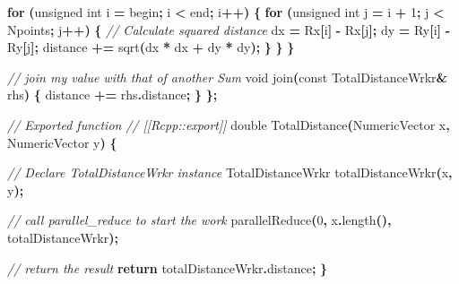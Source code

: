 \documentclass[
  12pt,
  french,
  a4paper,
  extrafontsizes,onecolumn,openright
  ]{memoir}
\newenvironment{Shaded}{\begin{snugshade}}{\end{snugshade}}
\newcommand{\AttributeTok}[1]{\textcolor[rgb]{0.13,0.29,0.53}{#1}}
\newcommand{\CommentTok}[1]{\textcolor[rgb]{0.56,0.35,0.01}{\textit{#1}}}
\newcommand{\ControlFlowTok}[1]{\textcolor[rgb]{0.13,0.29,0.53}{\textbf{#1}}}
\newcommand{\DataTypeTok}[1]{\textcolor[rgb]{0.13,0.29,0.53}{#1}}
\newcommand{\DecValTok}[1]{\textcolor[rgb]{0.00,0.00,0.81}{#1}}
\newcommand{\NormalTok}[1]{#1}
\newcommand{\OperatorTok}[1]{\textcolor[rgb]{0.81,0.36,0.00}{\textbf{#1}}}
\begin{document}
\begin{Shaded}
\begin{Highlighting}[]
    \ControlFlowTok{for} \OperatorTok{(}\DataTypeTok{unsigned} \DataTypeTok{int}\NormalTok{ i }\OperatorTok{=}\NormalTok{ begin}\OperatorTok{;}\NormalTok{ i }\OperatorTok{\textless{}}\NormalTok{ end}\OperatorTok{;}\NormalTok{ i}\OperatorTok{++)} \OperatorTok{\{}
      \ControlFlowTok{for} \OperatorTok{(}\DataTypeTok{unsigned} \DataTypeTok{int}\NormalTok{ j }\OperatorTok{=}\NormalTok{ i }\OperatorTok{+} \DecValTok{1}\OperatorTok{;}\NormalTok{ j }\OperatorTok{\textless{}}\NormalTok{ Npoints}\OperatorTok{;}\NormalTok{ j}\OperatorTok{++)} \OperatorTok{\{}
          \CommentTok{// Calculate squared distance}
\NormalTok{          dx }\OperatorTok{=}\NormalTok{ Rx}\OperatorTok{[}\NormalTok{i}\OperatorTok{]} \OperatorTok{{-}}\NormalTok{ Rx}\OperatorTok{[}\NormalTok{j}\OperatorTok{];}
\NormalTok{          dy }\OperatorTok{=}\NormalTok{ Ry}\OperatorTok{[}\NormalTok{i}\OperatorTok{]} \OperatorTok{{-}}\NormalTok{ Ry}\OperatorTok{[}\NormalTok{j}\OperatorTok{];}
\NormalTok{          distance }\OperatorTok{+=}\NormalTok{ sqrt}\OperatorTok{(}\NormalTok{dx }\OperatorTok{*}\NormalTok{ dx }\OperatorTok{+}\NormalTok{ dy }\OperatorTok{*}\NormalTok{ dy}\OperatorTok{);}
      \OperatorTok{\}}
    \OperatorTok{\}}
  \OperatorTok{\}}

  \CommentTok{// join my value with that of another Sum}
  \DataTypeTok{void}\NormalTok{ join}\OperatorTok{(}\AttributeTok{const}\NormalTok{ TotalDistanceWrkr}\OperatorTok{\&}\NormalTok{ rhs}\OperatorTok{)} \OperatorTok{\{} 
\NormalTok{    distance }\OperatorTok{+=}\NormalTok{ rhs}\OperatorTok{.}\NormalTok{distance}\OperatorTok{;} 
  \OperatorTok{\}}
\OperatorTok{\};}


\CommentTok{// Exported function}
\CommentTok{// [[Rcpp::export]]}
\DataTypeTok{double}\NormalTok{ TotalDistance}\OperatorTok{(}\NormalTok{NumericVector x}\OperatorTok{,}\NormalTok{ NumericVector y}\OperatorTok{)} \OperatorTok{\{}
  
  \CommentTok{// Declare TotalDistanceWrkr instance}
\NormalTok{  TotalDistanceWrkr totalDistanceWrkr}\OperatorTok{(}\NormalTok{x}\OperatorTok{,}\NormalTok{ y}\OperatorTok{);}
  
  \CommentTok{// call parallel\_reduce to start the work}
\NormalTok{  parallelReduce}\OperatorTok{(}\DecValTok{0}\OperatorTok{,}\NormalTok{ x}\OperatorTok{.}\NormalTok{length}\OperatorTok{(),}\NormalTok{ totalDistanceWrkr}\OperatorTok{);}
  
  \CommentTok{// return the result}
  \ControlFlowTok{return}\NormalTok{ totalDistanceWrkr}\OperatorTok{.}\NormalTok{distance}\OperatorTok{;}
\OperatorTok{\}}
\end{Highlighting}
\end{Shaded}
\end{document}
